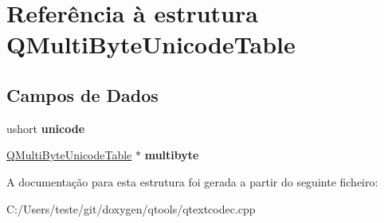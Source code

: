 \hypertarget{struct_q_multi_byte_unicode_table}{\section{Referência à estrutura Q\-Multi\-Byte\-Unicode\-Table}
\label{struct_q_multi_byte_unicode_table}
}
\subsection*{Campos de Dados}
\begin{DoxyCompactItemize}
\item 
\hypertarget{struct_q_multi_byte_unicode_table_aa5e5b4d5a951acfbc774acfc29ef7163}{ushort {\bfseries unicode}}\label{struct_q_multi_byte_unicode_table_aa5e5b4d5a951acfbc774acfc29ef7163}

\item 
\hypertarget{struct_q_multi_byte_unicode_table_a915a0a05dbc84f4b92e9f0b9c12aee86}{\hyperlink{struct_q_multi_byte_unicode_table}{Q\-Multi\-Byte\-Unicode\-Table} $\ast$ {\bfseries multibyte}}\label{struct_q_multi_byte_unicode_table_a915a0a05dbc84f4b92e9f0b9c12aee86}

\end{DoxyCompactItemize}


A documentação para esta estrutura foi gerada a partir do seguinte ficheiro\-:\begin{DoxyCompactItemize}
\item 
C\-:/\-Users/teste/git/doxygen/qtools/qtextcodec.\-cpp\end{DoxyCompactItemize}
